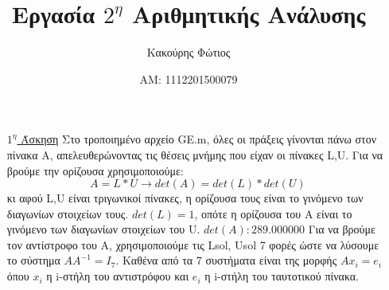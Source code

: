 \documentclass[12pt]{article}
\begin{document}
\title{Εργασία $2^\eta$ Αριθμητικής Ανάλυσης}
\date{ΑΜ: 1112201500079}
\author{Κακούρης Φώτιος}
\maketitle{}
    
\begin{enumerate}
    \item[\underline{$1^\eta$ Άσκηση}] Στο τροποιημένο αρχείο \textlatin{GE.m}, όλες οι πράξεις γίνονται πάνω στον πίνακα Α, 
    απελευθερώνοντας τις θέσεις μνήμης που είχαν οι πίνακες \textlatin{L,U}. \newline
    Για να βρούμε την ορίζουσα χρησιμοποιούμε: $$ A=L*U \rightarrow det(A)=det(L)*det(U) $$ κι αφού \textlatin{L,U} είναι τριγωνικοί πίνακες, η ορίζουσα τους είναι 
    το γινόμενο των διαγωνίων στοιχείων τους. $det(L)=1$, οπότε η ορίζουσα του Α είναι το γινόμενο των διαγωνίων στοιχείων του \textlatin{U}.  $det(A): 289.000000$ \newline
    Για να βρούμε τον αντίστροφο του Α, χρησιμοποιούμε τις \textlatin{Lsol, Usol} 7 φορές ώστε να λύσουμε το σύστημα $ AΑ^{-1} = I_7 $. Καθένα από τα 7 συστήματα είναι 
    της μορφής $A x_i = e_i $ όπου $x_i$ η \textlatin{i}-στήλη του αντιστρόφου και $e_i$ η \textlatin{i}-στήλη του ταυτοτικού πίνακα.


 


\end{enumerate}
\end{document}
